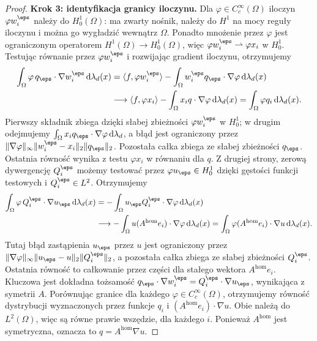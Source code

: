 \begin{proof}
\textbf{Krok 3: identyfikacja granicy iloczynu.}
Dla $\varphi\in C_c^\infty(\Omega)$ iloczyn
$\varphi w_i^\eps$ należy do $H_0^1(\Omega)$:
ma zwarty nośnik, należy do $H^1$ na mocy reguły
iloczynu i można go wygładzić wewnątrz $\Omega$.
Ponadto mnożenie przez $\varphi$ jest ograniczonym
operatorem $H^1(\Omega)\to H_0^1(\Omega)$,
więc $\varphi w_i^\eps\rightharpoonup\varphi x_i$
w $H_0^1$. Testując równanie przez $\varphi w_i^\eps$
i rozwijając gradient iloczynu, otrzymujemy
\begin{align*}
\int_\Omega\varphi\,q_\eps\cdot\nabla w_i^\eps
\,\mathrm d\lambda_d(x)
&=\langle f,\varphi w_i^\eps\rangle
 -\int_\Omega w_i^\eps q_\eps\cdot\nabla\varphi
 \,\mathrm d\lambda_d(x)\\
&\longrightarrow \langle f,\varphi x_i\rangle
 -\int_\Omega x_i q\cdot\nabla\varphi\,\mathrm d\lambda_d(x)
 =\int_\Omega\varphi q_i\,\mathrm d\lambda_d(x).
\end{align*}
Pierwszy składnik zbiega dzięki słabej zbieżności
$\varphi w_i^\eps$ w $H_0^1$; w drugim odejmujemy
$\int_\Omega x_iq_\eps\cdot\nabla\varphi\,\mathrm d\lambda_d$,
a błąd jest ograniczony przez
$\|\nabla\varphi\|_\infty\|w_i^\eps-x_i\|_2\|q_\eps\|_2$.
Pozostała całka zbiega ze słabej zbieżności $q_\eps$.
Ostatnia równość wynika z testu $\varphi x_i$
w równaniu dla $q$.
Z drugiej strony, zerową dywergencję $Q_i^\eps$
możemy testować przez $\varphi u_\eps\in H_0^1$
dzięki gęstości funkcji testowych i $Q_i^\eps\in L^2$.
Otrzymujemy
\begin{align*}
\int_\Omega\varphi\,Q_i^\eps\cdot\nabla u_\eps
\,\mathrm d\lambda_d(x)
&=-\int_\Omega u_\eps Q_i^\eps\cdot\nabla\varphi
\,\mathrm d\lambda_d(x)\\
&\longrightarrow
 -\int_\Omega u(A^{\mathrm{hom}}e_i)\cdot\nabla\varphi
 \,\mathrm d\lambda_d(x)
 =\int_\Omega\varphi(A^{\mathrm{hom}}e_i)\cdot\nabla u
 \,\mathrm d\lambda_d(x).
\end{align*}
Tutaj błąd zastąpienia $u_\eps$ przez $u$ jest
ograniczony przez
$\|\nabla\varphi\|_\infty\|u_\eps-u\|_2\|Q_i^\eps\|_2$,
a pozostała całka zbiega ze słabej zbieżności
$Q_i^\eps$. Ostatnia równość to całkowanie przez
części dla stałego wektora $A^{\mathrm{hom}}e_i$.
Kluczowa jest dokładna tożsamość
$q_\eps\cdot\nabla w_i^\eps
=Q_i^\eps\cdot\nabla u_\eps$, wynikająca z symetrii $A$.
Porównując granice dla każdego $\varphi\in C_c^\infty(\Omega)$,
otrzymujemy równość dystrybucji wyznaczonych
przez funkcje $q_i$ i $(A^{\mathrm{hom}}e_i)\cdot\nabla u$.
Obie należą do $L^2(\Omega)$, więc są równe
prawie wszędzie, dla każdego $i$.
Ponieważ $A^{\mathrm{hom}}$ jest symetryczna, oznacza to
$q=A^{\mathrm{hom}}\nabla u$.


\end{proof}
